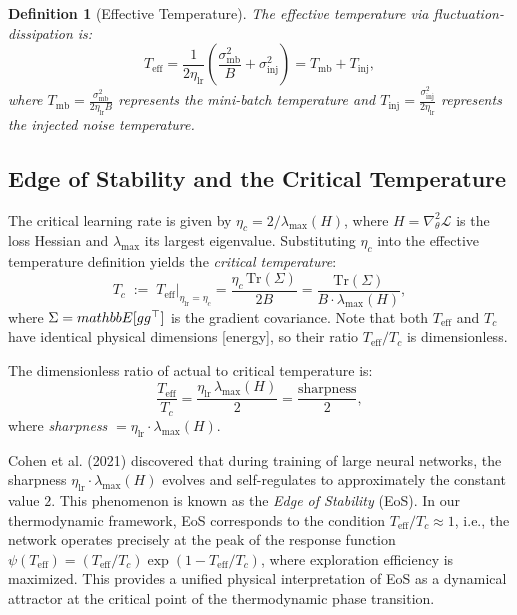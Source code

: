 \documentclass[11pt, a4paper]{article}
\newtheorem{dfn}[theo]{Definition}
\theoremstyle{plain}
\begin{document}
\begin{dfn}[Effective Temperature]\label{dfn:teff}
The effective temperature via fluctuation-dissipation is:
\begin{equation}
T_{\text{eff}} = \frac{1}{2\eta_{\text{lr}}}\left(\frac{\sigma_{\text{mb}}^2}{B} + \sigma_{\text{inj}}^2\right) = T_{\text{mb}} + T_{\text{inj}},
\label{eq:teff}
\end{equation}
where $T_{\text{mb}} = \frac{\sigma_{\text{mb}}^2}{2\eta_{\text{lr}}B}$ represents the mini-batch temperature and $T_{\text{inj}} = \frac{\sigma_{\text{inj}}^2}{2\eta_{\text{lr}}}$ represents the injected noise temperature.
\end{dfn}
\subsection{Edge of Stability and the Critical Temperature}\label{sec:EoS}
\label{dfn:critical_temp}
The critical learning rate is given by $\eta_c = 2/\lambda_{\max}(H)$, where $H = \nabla_\theta^2 \mathcal{L}$ is the loss Hessian and $\lambda_{\max}$ its largest eigenvalue. Substituting $\eta_c$ into the effective temperature definition yields the \emph{critical temperature}:
\begin{equation}
T_c \;:=\; T_{\text{eff}}\big|_{\eta_{\text{lr}}=\eta_c}
= \frac{\eta_c \, \mathrm{Tr}(\Sigma)}{2B}
= \frac{\mathrm{Tr}(\Sigma)}{B \cdot \lambda_{\max}(H)},
\label{eq:T_c_def}
\end{equation}
where $\Sigma = \\mathbb{E}[gg^\top]$ is the gradient covariance.
Note that both $T_{\text{eff}}$ and $T_c$ have identical physical dimensions [energy], so their ratio $T_{\text{eff}}/T_c$ is dimensionless.

The dimensionless ratio of actual to critical temperature is:
\begin{equation}
\frac{T_{\text{eff}}}{T_c}
= \frac{\eta_{\text{lr}} \, \lambda_{\max}(H)}{2}
= \frac{\text{sharpness}}{2},
\label{eq:EoS_ratio}
\end{equation}
where \emph{sharpness} $= \eta_{\text{lr}} \cdot \lambda_{\max}(H)$.

\begin{rema}
Cohen et al. (2021) discovered that during training of large neural networks, the sharpness $\eta_{\text{lr}} \cdot \lambda_{\max}(H)$ evolves and self-regulates to approximately the constant value $2$. This phenomenon is known as the \emph{Edge of Stability} (EoS). In our thermodynamic framework, EoS corresponds to the condition $T_{\text{eff}}/T_c \approx 1$, i.e., the network operates precisely at the peak of the response function $\psi(T_{\text{eff}}) = (T_{\text{eff}}/T_c)\exp(1-T_{\text{eff}}/T_c)$, where exploration efficiency is maximized. This provides a unified physical interpretation of EoS as a dynamical attractor at the critical point of the thermodynamic phase transition.
\end{rema}
\end{document}
